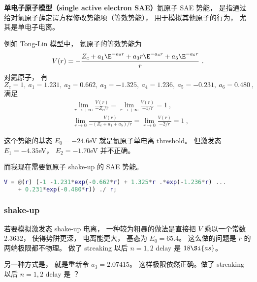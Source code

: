 
\begin{issues}
\issueDraft
\end{issues}

\textbf{单电子原子模型（single active electron SAE）}氦原子 SAE 势能， 是指通过给对氢原子薛定谔方程修改势能项（等效势能）， 用于模拟其他原子的行为， 尤其是单电子电离。

例如 Tong-Lin 模型中， 氦原子的等效势能为
\begin{equation}
V(r) = -\frac{Z_c + a_1 \E^{-a_2 r} + a_3 r \E^{-a_4 r} + a_5 \E^{-a_6 r}}{r}~.
\end{equation}
对氦原子， 有
\begin{equation}
Z_c = 1, \ a_1 = 1.231,\ a_2 = 0.662,\ a_3 = -1.325,\ a_4 = 1.236,\ a_5 = -0.231,\ a_6 = 0.480~,
\end{equation}
满足
\begin{align}
&\lim_{r\to +\infty} \frac{V(r)}{-Z_c/r} = \lim_{r\to +\infty} \frac{V(r)}{-1/r} = 1~,\\
&\lim_{r\to 0} \frac{V(r)}{-(Z_c + a_1 + a_5)/r} = \lim_{r\to 0} \frac{V(r)}{-2/r} = 1~,
\end{align}

这个势能的基态 $E_0 = -24.6$eV 就是氦原子单电离 threshold。 但激发态 $E_1 = -4.35$eV， $E_2 = -1.70$eV 并不正确。

而我现在需要氦原子 shake-up 的 SAE 势能。

\begin{lstlisting}[language=matlab]
V = @(r) (-1 -1.231*exp(-0.662*r) + 1.325*r .*exp(-1.236*r) ...
    + 0.231*exp(-0.480*r)) ./ r;
\end{lstlisting}

\subsubsection{shake-up}
若要模拟激发态 shake-up 电离， 一种较为粗暴的做法是直接把 $V$ 乘以一个常数 $2.3632$， 使得势阱更深， 电离能更大， 基态为 $E_0 = 65.4$。 这么做的问题是 $r$ 的两端极限都不物理。 做了 streaking 以后 $n=1,2$ delay 是 $18\Si{as}$。

另一种方式是， 就是重新令 $a_3 = 2.07415$。 这样极限依然正确。做了 streaking 以后 $n=1,2$ delay 是 ？
